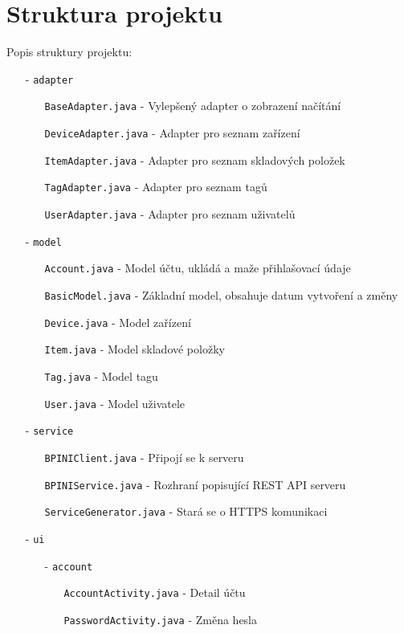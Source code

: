 \documentclass[12pt]{report}
\begin{document}
\section{Struktura projektu}
Popis struktury projektu:
\begingroup
\fontsize{8pt}{12pt}\selectfont		
\begin{itemize}[noitemsep,nolistsep]

\item [-] \texttt{adapter}
	\begin{itemize}[noitemsep, nolistsep]
		\item [] \texttt{BaseAdapter.java} - Vylepšený adapter o zobrazení načítání
		\item [] \texttt{DeviceAdapter.java} - Adapter pro seznam zařízení
		\item [] \texttt{ItemAdapter.java} - Adapter pro seznam skladových položek
		\item [] \texttt{TagAdapter.java} - Adapter pro seznam tagů
		\item [] \texttt{UserAdapter.java} - Adapter pro seznam uživatelů
	\end{itemize}
	
\item [-] \texttt{model}
	\begin{itemize}[noitemsep, nolistsep]
		\item [] \texttt{Account.java} - Model účtu, ukládá a maže přihlašovací údaje
		\item [] \texttt{BasicModel.java} - Základní model, obsahuje datum vytvoření a změny
		\item [] \texttt{Device.java} - Model zařízení
		\item [] \texttt{Item.java} - Model skladové položky
		\item [] \texttt{Tag.java} - Model tagu
		\item [] \texttt{User.java} - Model uživatele
	\end{itemize}
	
\item [-] \texttt{service}
	\begin{itemize}[noitemsep, nolistsep]
		\item [] \texttt{BPINIClient.java} - Připojí se k serveru
		\item [] \texttt{BPINIService.java} - Rozhraní popisující REST API serveru
		\item [] \texttt{ServiceGenerator.java} - Stará se o HTTPS komunikaci
	\end{itemize}
	
\item [-] \texttt{ui}
	\begin{itemize}[noitemsep, nolistsep]
		\item [-] \texttt{account} 
		\begin{itemize}[noitemsep, nolistsep]
			\item [] \texttt{AccountActivity.java} - Detail účtu
			\item [] \texttt{PasswordActivity.java} - Změna hesla
		\end{itemize}
		

\end{itemize}
\end{itemize}
\end{document}
